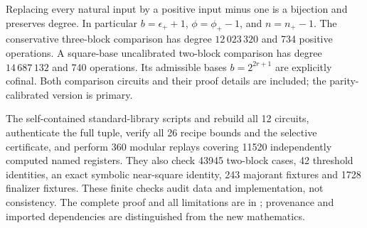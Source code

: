 Replacing every natural input by a positive input minus one is a bijection
and preserves degree. In particular \(b=\epsilon_++1\),
\(\phi=\phi_+-1\), and \(n=n_+-1\).
The conservative three-block comparison has degree \(12\,023\,320\) and
734 positive operations. A square-base uncalibrated two-block comparison
has degree \(14\,687\,132\) and 740 operations. Its admissible bases
\(b=2^{2r+1}\) are explicitly cofinal. Both comparison circuits and their
proof details are included; the parity-calibrated version is primary.

The self-contained standard-library scripts  and
 rebuild all 12 circuits, authenticate the full tuple,
verify all 26 recipe bounds and the selective certificate, and perform
360 modular replays covering 11520 independently computed named registers.
They also check 43945 two-block cases, 42 threshold identities, an exact
symbolic near-square identity, 243 majorant fixtures and 1728 finalizer
fixtures. These finite checks audit data and implementation, not consistency.
The complete proof and all limitations are in ; provenance
and imported dependencies are distinguished from the new mathematics.
